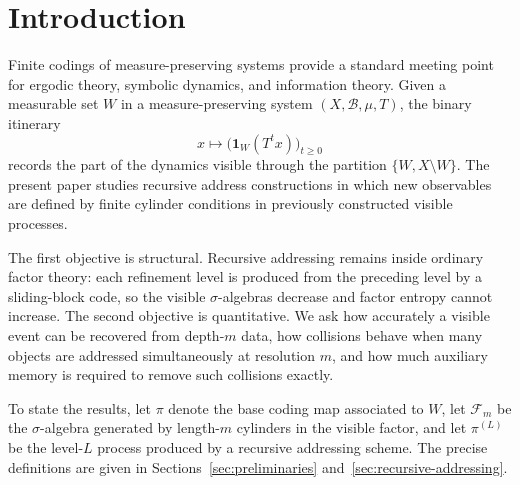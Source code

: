 \section{Introduction}\label{sec:introduction}

Finite codings of measure-preserving systems provide a standard meeting
point for ergodic theory, symbolic dynamics, and information theory.
Given a measurable set \(W\) in a measure-preserving system
\((X,\mathcal{B},\mu,T)\), the binary itinerary
\[
  x \longmapsto \bigl(\mathbf{1}_W(T^t x)\bigr)_{t\geq 0}
\]
records the part of the dynamics visible through the partition
\(\{W,X\setminus W\}\).  The present paper studies recursive address
constructions in which new observables are defined by finite cylinder
conditions in previously constructed visible processes.

The first objective is structural.  Recursive addressing remains inside
ordinary factor theory: each refinement level is produced from the
preceding level by a sliding-block code, so the visible
\(\sigma\)-algebras decrease and factor entropy cannot increase.  The
second objective is quantitative.  We ask how accurately a visible
event can be recovered from depth-\(m\) data, how collisions behave when
many objects are addressed simultaneously at resolution \(m\), and how
much auxiliary memory is required to remove such collisions exactly.

To state the results, let \(\pi\) denote the base coding map associated
to \(W\), let \(\mathcal{F}_m\) be the \(\sigma\)-algebra generated by
length-\(m\) cylinders in the visible factor, and let \(\pi^{(L)}\) be
the level-\(L\) process produced by a recursive addressing scheme.  The
precise definitions are given in
Sections~\ref{sec:preliminaries} and~\ref{sec:recursive-addressing}.

